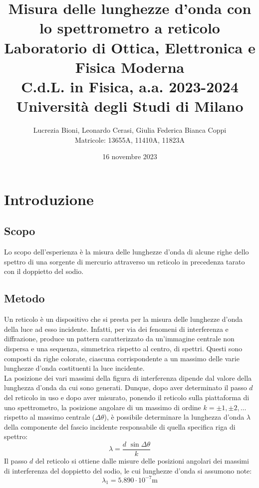 \documentclass[]{article}
\title{%
    \Huge Misura delle lunghezze d'onda con lo spettrometro a reticolo \\
    \Large Laboratorio di Ottica, Elettronica e Fisica Moderna \\ C.d.L. in Fisica, a.a. 2023-2024 \\ Università degli Studi di Milano}
\author{\LARGE Lucrezia Bioni, Leonardo Cerasi, Giulia Federica Bianca Coppi \\ Matricole: 13655A, 11410A, 11823A}
\date{16 novembre 2023}
\let\oldsection\section%
\renewcommand{\section}{%
	\renewcommand{\theequation}{\thesection.\arabic{equation}}%
	\oldsection}%
\let\oldsubsection\subsection%
\renewcommand{\subsection}{%
	\renewcommand{\theequation}{\thesubsection.\arabic{equation}}%
	\oldsubsection}%
\begin{document}
    \maketitle

    \section{Introduzione}

    \subsection{Scopo}
    Lo scopo dell'esperienza è la misura delle lunghezze d'onda di alcune righe dello spettro di una sorgente di mercurio attraverso un reticolo in precedenza tarato con il doppietto del sodio.

    \subsection{Metodo}
    Un reticolo è un dispositivo che si presta per la misura delle lunghezze d'onda della luce ad esso incidente. Infatti, per via dei fenomeni di interferenza e diffrazione, produce un pattern caratterizzato da un'immagine centrale non dispersa e una sequenza, simmetrica rispetto al centro, di spettri. Questi sono composti da righe colorate, ciascuna corrispondente a un massimo delle varie lunghezze d'onda costituenti la luce incidente. \\
    La posizione dei vari massimi della figura di interferenza dipende dal valore della lunghezza d'onda da cui sono generati. Dunque, dopo aver determinato il passo $d$ del reticolo in uso e dopo aver misurato, ponendo il reticolo sulla piattaforma di uno spettrometro, la posizione angolare di un massimo di ordine $k=\pm 1, \pm 2,\ldots$ rispetto al massimo centrale ($\Delta \theta$), è possibile determinare la lunghezza d'onda $\lambda$ della componente del fascio incidente responsabile di quella specifica riga di spettro:
    \begin{equation}
        \label{lambda}
        \lambda = \frac{d \, \, \sin{\Delta\theta}}{k}
    \end{equation}
    Il passo $d$ del reticolo si ottiene dalle misure delle posizioni angolari dei massimi di interferenza del doppietto del sodio, le cui lunghezze d'onda si assumono note:
    \begin{equation}
        \label{lambda-sodio-1}
        \lambda_1 = 5.890 \cdot 10^{-7} \text{m}
    \end{equation}
\end{document}

